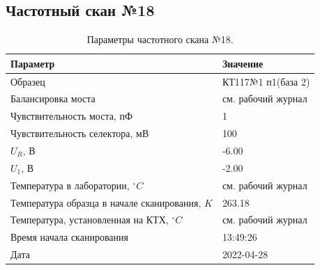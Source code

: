 \subsection{Частотный скан №18}
\begin{table}[!ht]
    \centering
    \caption{Параметры частотного скана №18.}
    \begin{tabular}{|l|l|}
        \hline
        Параметр                                       & Значение                  \\ \hline
        Образец                                        & КТ117№1 п1(база 2)        \\ \hline
        Балансировка моста                             & см. рабочий журнал        \\ \hline
        Чувствительность моста, пФ                     & 1                         \\ \hline
        Чувствительность селектора, мВ                 & 100                       \\ \hline
        $U_R$, В                                       & -6.00                     \\ \hline
        $U_1$, В                                       & -2.00                     \\ \hline
        Температура в лаборатории, $^\circ C$          & см. рабочий журнал        \\ \hline
        Температура образца в начале сканирования, $K$ & 263.18                    \\ \hline
        Температура, установленная на КТХ, $^\circ C$  & см. рабочий журнал        \\ \hline
        Время начала сканирования                      & 13:49:26                  \\ \hline
        Дата                                           & 2022-04-28                \\ \hline
    \end{tabular}
    \label{table:frequency_scan_18}
\end{table}

